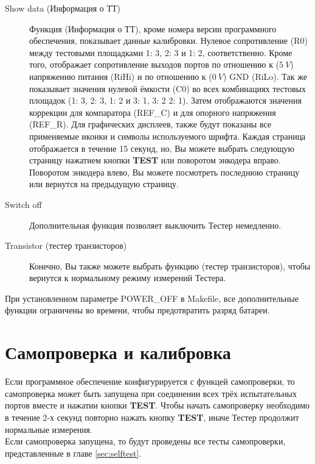 \begin{description}
 \item[Show data (Информация о ТТ)]
 Функция  (Информация о ТТ), кроме номера версии программного обеспечения, показывает данные калибровки.
Нулевое сопротивление (R0) между тестовыми площадками 1: 3, 2: 3 и 1: 2, соответственно.
Кроме того, отображает сопротивление выходов портов по отношению к (\(5~V\)) напряжению питания (RiHi) и
по отношению к (\(0~V\)) GND (RiLo).
Так же показывает значения нулевой ёмкости (C0) во всех комбинациях тестовых площадок (1: 3, 2: 3, 1: 2 и 3: 1, 3: 2 2: 1).
Затем отображаются значения коррекции для компаратора (REF\_C) и для опорного напряжения (REF\_R).
Для графических дисплеев, также будут показаны все применяемые иконки и символы используемого шрифта.
Каждая страница отображается в течение 15 секунд, но, Вы можете выбрать следующую страницу нажатием кнопки \textbf{ TEST} или поворотом 
энкодера вправо.
Поворотом энкодера влево, Вы можете посмотреть последнюю страницу или вернутся на предыдущую страницу.\\

 \item[Switch off] 
 Дополнительная функция  позволяет выключить Тестер немедленно.\\ 

 \item[Transistor (тестер транзисторов)]
 Конечно, Вы также можете выбрать функцию  (тестер транзисторов), чтобы вернутся к нормальному режиму измерений Тестера.
\end{description}

При установленном параметре POWER\_OFF в Makefile, все дополнительные функции ограничены во времени, чтобы предотвратить разряд батареи.


\section{Самопроверка и калибровка}

Если программное обеспечение конфигурируется с функцей самопроверки, то самопроверка может быть запущена 
при соединении всех трёх испытательных портов вместе и нажатии кнопки \textbf{ TEST}. Чтобы начать самопроверку 
необходимо в течение 2-х секунд повторно нажать кнопку \textbf{ TEST}, иначе Тестер продолжит нормальные 
измерения.\\

Если самопроверка запущена, то будут проведены все тесты самопроверки, представленные в главе \ref{sec:selftest}.\\

